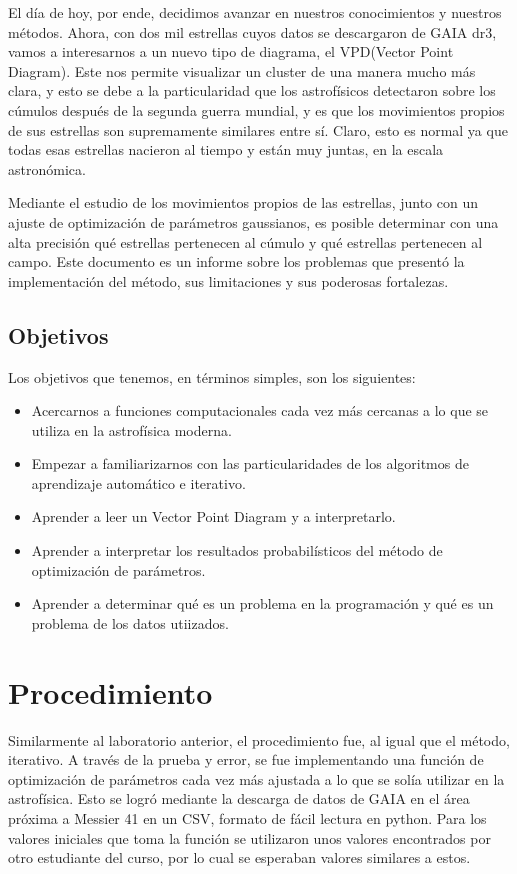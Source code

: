 \documentclass[10pt,twocolumn]{article}
\begin{document}
El día de hoy, por ende, decidimos avanzar en nuestros conocimientos y nuestros métodos. Ahora, con dos mil estrellas cuyos datos se descargaron de GAIA dr3,
vamos a interesarnos a un nuevo tipo de diagrama, el VPD(Vector Point Diagram). Este nos permite visualizar un cluster de una manera mucho más clara,
y esto se debe a la particularidad que los astrofísicos detectaron sobre los cúmulos después de la segunda guerra mundial, y es que los movimientos propios
de sus estrellas son supremamente similares entre sí. Claro, esto es normal ya que todas esas estrellas nacieron al tiempo y están muy juntas, en la 
escala astronómica. 

Mediante el estudio de los movimientos propios de las estrellas, junto con un ajuste de optimización de parámetros gaussianos, es posible determinar
con una alta precisión qué estrellas pertenecen al cúmulo y qué estrellas pertenecen al campo. Este documento es un informe sobre los problemas que 
presentó la implementación del método, sus limitaciones y sus poderosas fortalezas. 


\subsection{Objetivos}

Los objetivos que tenemos, en términos simples, son los siguientes:
\begin{itemize}
    \item Acercarnos a funciones computacionales cada vez más cercanas a lo que se utiliza en la astrofísica moderna.
    \item Empezar a familiarizarnos con las particularidades de los algoritmos de aprendizaje automático e iterativo.
    \item Aprender a leer un Vector Point Diagram y a interpretarlo.
    \item Aprender a interpretar los resultados probabilísticos del método de optimización de parámetros.
    \item Aprender a determinar qué es un problema en la programación y qué es un problema de los datos utiizados.
\end{itemize}


\section{Procedimiento}

Similarmente al laboratorio anterior, el procedimiento fue, al igual que el método, iterativo. A través de la prueba y error, 
se fue implementando una función de optimización de parámetros cada vez más ajustada a lo que se solía utilizar en la
astrofísica. Esto se logró mediante la descarga de datos de GAIA en el área próxima a Messier 41 en un CSV, formato
de fácil lectura en python. Para los valores iniciales que toma la función se utilizaron unos valores encontrados por
otro estudiante del curso, por lo cual se esperaban valores similares a estos. 
\end{document}
